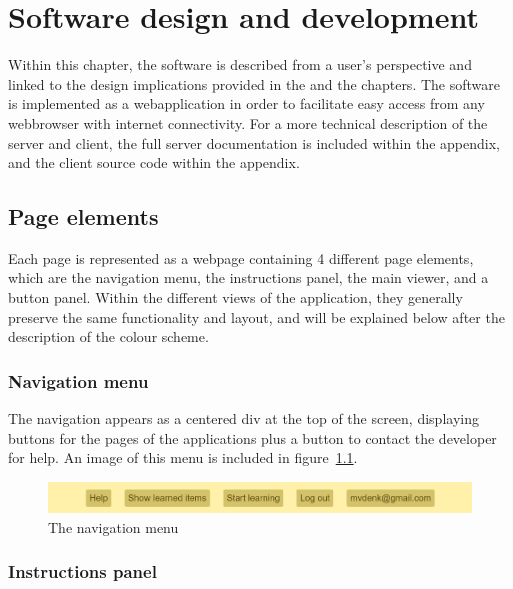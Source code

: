 \chapter{Software design and development}
\label{ch:software}

Within this chapter, the software is described from a user's perspective and linked to the design implications provided in the  and the  chapters. The software is implemented as a webapplication in order to facilitate easy access from any webbrowser with internet connectivity. For a more technical description of the server and client, the full server documentation is included within the  appendix, and the client source code within the  appendix.

\section{Page elements}

Each page is represented as a webpage containing 4 different page elements, which are the navigation menu, the instructions panel, the main viewer, and a button panel. Within the different views of the application, they generally preserve the same functionality and layout, and will be explained below after the description of the colour scheme.

\subsection{Navigation menu}

The navigation appears as a centered div at the top of the screen, displaying buttons for the pages of the applications plus a button to contact the developer for help. An image of this menu is included in figure~\ref{fig:navmenu}.

\begin{figure}
    \centering
    \includegraphics[width=.8\textwidth]{img/navmenu.png}
    \caption{The navigation menu}
    \label{fig:navmenu}
\end{figure}

\subsection{Instructions panel}

